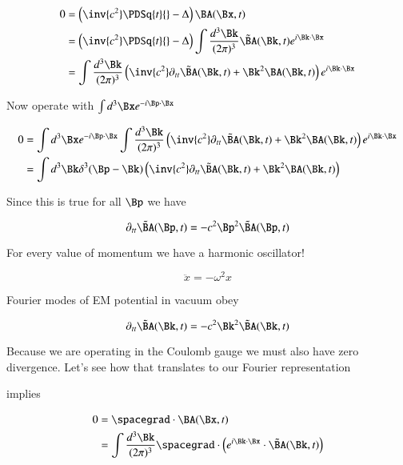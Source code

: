 \begin{align*}
0 &= 
\left( \inv{c^2} \PDSq{t}{} - \Delta \right) \BA(\Bx, t) \\
&=
\left( \inv{c^2} \PDSq{t}{} - \Delta \right) 
\int 
\frac{d^3 \Bk}{(2\pi)^3} 
\tilde{\BA}(\Bk, t) e^{i \Bk \cdot \Bx} \\
&=
\int 
\frac{d^3 \Bk}{(2\pi)^3} 
\left( 
\inv{c^2} \partial_{tt} \tilde{\BA}(\Bk, t) + \Bk^2 \BA(\Bk, t)
\right)
e^{i \Bk \cdot \Bx} 
\end{align*}

Now operate with $\int d^3 \Bx e^{-i \Bp \cdot \Bx }$

\begin{align*}
0 &=
\int d^3 \Bx e^{-i \Bp \cdot \Bx }
\int 
\frac{d^3 \Bk}{(2\pi)^3} 
\left( 
\inv{c^2} \partial_{tt} \tilde{\BA}(\Bk, t) + \Bk^2 \BA(\Bk, t)
\right)
e^{i \Bk \cdot \Bx}  \\
&=
\int 
d^3 \Bk
\delta^3(\Bp -\Bk) 
\left( 
\inv{c^2} \partial_{tt} \tilde{\BA}(\Bk, t) + \Bk^2 \BA(\Bk, t)
\right)
\end{align*}

Since this is true for all $\Bp$ we have

\begin{equation}\label{eqn:relativisticElectrodynamicsL15:490}
\partial_{tt} \tilde{\BA}(\Bp, t) = -c^2 \Bp^2 \tilde{\BA}(\Bp, t) 
\end{equation}

For every value of momentum we have a harmonic oscillator!

\begin{equation}\label{eqn:relativisticElectrodynamicsL15:510}
\ddot{x} = -\omega^2 x
\end{equation}

Fourier modes of EM potential in vacuum obey

\begin{equation}\label{eqn:relativisticElectrodynamicsL15:530}
\partial_{tt} \tilde{\BA}(\Bk, t) = -c^2 \Bk^2 \tilde{\BA}(\Bk, t)
\end{equation}

Because we are operating in the Coulomb gauge we must also have zero divergence.  Let's see how that translates to our Fourier representation


implies

\begin{align*}
0 &= \spacegrad \cdot \BA(\Bx, t) \\
&= \int \frac{d^3 \Bk }{(2 \pi)^3} \spacegrad \cdot \left( e^{i \Bk \cdot \Bx} \cdot \tilde{\BA}(\Bk, t) \right)
\end{align*}

